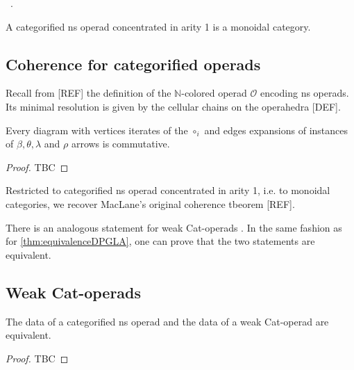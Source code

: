 \begin{definition}
\begin{center}
{  } \quad \ .
\end{center}
\end{definition}

A categorified ns operad concentrated in arity 1 is a monoidal category.




\subsection{Coherence for categorified operads}

Recall from [REF] the definition of the $\mathbb{N}$-colored operad $\mathcal{O}$ encoding ns operads. Its minimal resolution is given by the cellular chains on the operahedra [DEF]. 


\begin{thm} \label{thm:coherence}
    Every diagram with vertices iterates of the $\circ_i$ and edges expansions of instances of $\beta, \theta, \lambda$ and $\rho$ arrows is commutative. 
\end{thm}

\begin{proof} TBC
\end{proof}

Restricted to categorified ns operad concentrated in arity 1, i.e. to monoidal categories, we recover MacLane's original coherence tbeorem [REF].

There is an analogous statement for weak Cat-operads \cite[Proposition 14.2]{DP15}. In the same fashion as for \cref{thm:equivalenceDPGLA}, one can prove that the two statements are equivalent. 


\subsection{Weak Cat-operads}

\begin{definition}
\end{definition}

\begin{thm} \label{thm:equivalenceDPGLA}
    The data of a categorified ns operad and the data of a weak Cat-operad are equivalent.  
\end{thm}

\begin{proof}
    TBC
\end{proof}



